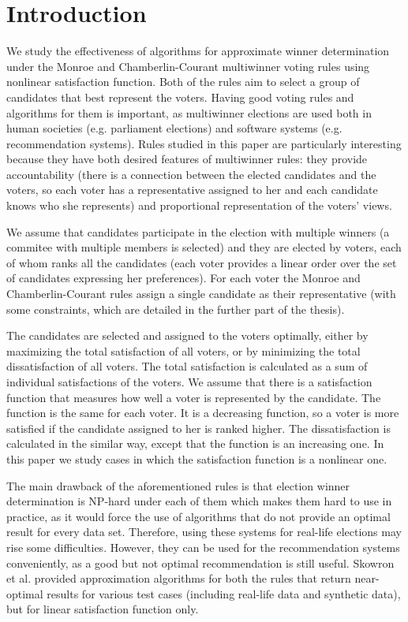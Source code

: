 \chapter{Introduction}
\label{cha:introduction}

We study the effectiveness of algorithms for approximate winner determination under the Monroe and Chamberlin-Courant multiwinner voting rules using nonlinear satisfaction function. Both of the rules aim to select a group of candidates that best represent the voters. Having good voting rules and algorithms for them is important, as multiwinner elections are used both in human societies (e.g. parliament elections) and software systems (e.g. recommendation systems). Rules studied in this paper are particularly interesting because they have both desired features of multiwinner rules: they provide accountability (there is a connection between the elected candidates and the voters, so each voter has a representative assigned to her and each candidate knows who she represents) and proportional representation of the voters’ views.

We assume that candidates participate in the election with multiple winners (a commitee with multiple members is selected) and they are elected by voters, each of whom ranks all the candidates (each voter provides a linear order over the set of candidates expressing her preferences). For each voter the Monroe and Chamberlin-Courant rules assign a single candidate as their representative (with some constraints, which are detailed in the further part of the thesis).

The candidates are selected and assigned to the voters optimally, either by maximizing the total satisfaction of all voters, or by minimizing the total dissatisfaction of all voters.
The total satisfaction is calculated as a sum of individual satisfactions of the voters. We assume that there is a  satisfaction function that measures how well a voter is represented by the candidate. The function is the same for each voter. It is a decreasing function, so a voter is more satisfied if the candidate assigned to her is ranked higher. The dissatisfaction is calculated in the similar way, except that the function is an increasing one. In this paper we study cases in which the satisfaction function is a nonlinear one.

The main drawback of the aforementioned rules is that election winner determination is NP-hard under each of them \cite{2} which makes them hard to use in practice, as it would force the use of algorithms that do not provide an optimal result for every data set. Therefore, using these systems for real-life elections may rise some difficulties. However, they can be used for the recommendation systems conveniently, as a good but not optimal recommendation is still useful. Skowron et al. \cite{1} provided approximation algorithms for both the rules that return near-optimal results for various test cases (including real-life data and synthetic data), but for linear satisfaction function only.

